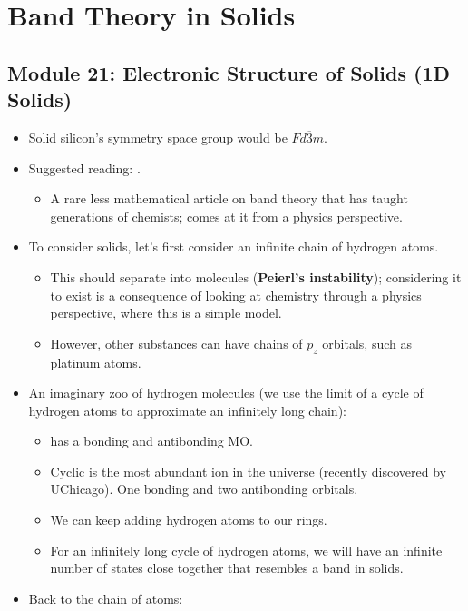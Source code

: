 \documentclass[../notes.tex]{subfiles}
\begin{document}
\chapter{Band Theory in Solids}
\section{Module 21: Electronic Structure of Solids (1D Solids)}
\begin{itemize}
    \item {}Solid silicon's symmetry space group would be $Fd\overline{3}m$.
    \item Suggested reading: \textcite{bib:bandTheory}.
    \begin{itemize}
        \item A rare less mathematical article on band theory that has taught generations of chemists; comes at it from a physics perspective.
    \end{itemize}
    \item To consider solids, let's first consider an infinite chain of hydrogen atoms.
    \begin{itemize}
        \item This should separate into  molecules (\textbf{Peierl's instability}); considering it to exist is a consequence of looking at chemistry through a physics perspective, where this is a simple model.
        \item However, other substances can have chains of $p_z$ orbitals, such as platinum atoms.
    \end{itemize}
    \item An imaginary zoo of hydrogen molecules (we use the limit of a cycle of hydrogen atoms to approximate an infinitely long chain):
    \begin{itemize}
        \item {} has a bonding and antibonding MO.
        \item Cyclic  is the most abundant ion in the universe (recently discovered by UChicago). One bonding and two antibonding orbitals.
        \item We can keep adding hydrogen atoms to our rings.
        \item For an infinitely long cycle of hydrogen atoms, we will have an infinite number of states close together that resembles a band in solids.
    \end{itemize}
    \item Back to the chain of  atoms:

\end{itemize}
\end{document}
